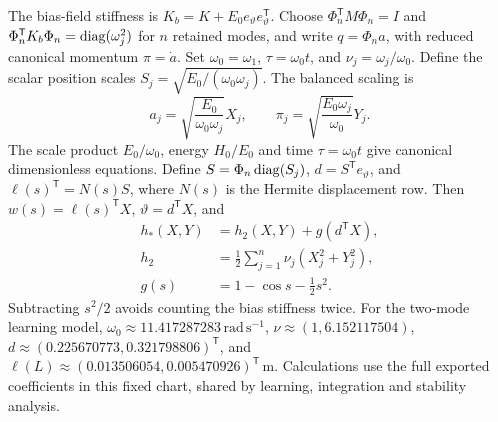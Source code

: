 The bias-field stiffness is $K_b=K+E_0e_\vartheta e_\vartheta^{\mathsf T}$.
Choose $\Phi_n^{\mathsf T}M\Phi_n=I$ and
$\Phi_n^{\mathsf T}K_b\Phi_n=\operatorname{diag}(\omega_j^2)$ for $n$ retained modes,
and write $q=\Phi_n a$, with reduced canonical momentum $\pi=\dot a$.
Set $\omega_0=\omega_1$, $\tau=\omega_0t$, and $\nu_j=\omega_j/\omega_0$.
Define the scalar position scales $S_j=\sqrt{E_0/(\omega_0\omega_j)}$.
The balanced scaling is
\begin{equation}
 a_j=\sqrt{\frac{E_0}{\omega_0\omega_j}}X_j,
 \qquad
 \pi_j=\sqrt{\frac{E_0\omega_j}{\omega_0}}Y_j.
 \label{eq:unified-scale}
\end{equation}
The scale product $E_0/\omega_0$, energy $H_0/E_0$ and time
$\tau=\omega_0t$ give canonical dimensionless equations.
Define $S=\Phi_n\operatorname{diag}(S_j)$,
$d=S^{\mathsf T}e_\vartheta$, and $\ell(s)^{\mathsf T}=N(s)S$, where
$N(s)$ is the Hermite displacement row. Then
$w(s)=\ell(s)^{\mathsf T}X$, $\vartheta=d^{\mathsf T}X$, and
\begin{align}
 h_*(X,Y)&=h_2(X,Y)+g(d^{\mathsf T}X),\nonumber\\
 h_2&=\tfrac12\sum_{j=1}^n\nu_j(X_j^2+Y_j^2),\nonumber\\
 g(s)&=1-\cos s-\tfrac12s^2.
 \label{eq:unified-h}
\end{align}
Subtracting $s^2/2$ avoids counting the bias stiffness twice.
For the two-mode learning model, $\omega_0\approx11.417287283\,\mathrm{rad\,s^{-1}}$,
$\nu\approx(1,6.152117504)$, $d\approx(0.225670773,0.321798806)^{\mathsf T}$,
and $\ell(L)\approx(0.013506054,0.005470926)^{\mathsf T}\,\mathrm m$.
Calculations use the full exported coefficients in this fixed chart,
shared by learning, integration and stability analysis.

